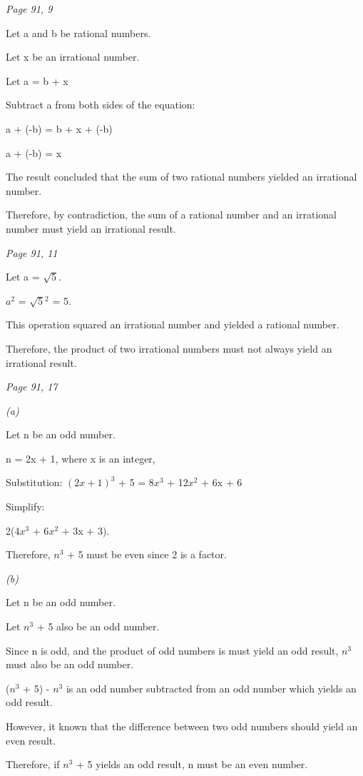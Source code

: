 \documentclass{article}
\begin{document}
\begin{flushleft}
\vspace{0.25cm}
\textit{Page 91, 9}\par
Let a and b be rational numbers.\par
Let x be an irrational number.\par
Let a = b + x\par 
Subtract a from both sides of the equation: \par
a + (-b) = b + x + (-b)\par
a + (-b) = x\par
The result concluded that the sum of two rational numbers yielded an irrational number.\par
Therefore, by contradiction, the sum of a rational number and an irrational number must yield an irrational result.\par

\vspace{0.25cm}
\textit{Page 91, 11}\par
Let a = \(\sqrt{5}\).\par
$a^2$ =  \(\sqrt{5}\)$^2$ = 5.\par
This operation squared an irrational number and yielded a rational number.\par
Therefore, the product of two irrational numbers must not always yield an irrational result.\par

\vspace{0.25cm}
\textit{Page 91, 17}\par
\textit{(a)}\par
Let n be  an odd number.\par
n = 2x + 1, where x is an integer,\par
Substitution: $(2x + 1)^3$ + 5 = 8$x^3$ + 12$x^2$ + 6x + 6\par
Simplify:\par
 2(4$x^3$ + 6$x^2$ + 3x + 3).\par
Therefore, $n^3$ + 5 must be even since 2 is a factor.

\vspace{0.25cm}
\textit{(b)}\par
Let n be an odd number.\par
Let $n^3$ + 5 also be an odd number.\par
Since n is odd, and the product of odd numbers is must yield an odd result, $n^3$ must also be an odd number.\par
($n^3$ + 5) - $n^3$ is an odd number subtracted from an odd number which yields an odd result.\par
However, it known that the difference between two odd numbers should yield an even result.\par
Therefore, if $n^3$ + 5 yields an odd result, n must be an even number.


\end{flushleft}
\end{document}
